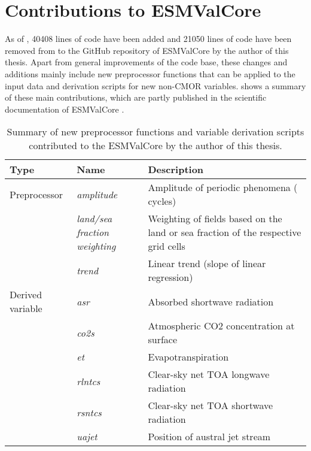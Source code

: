 \section{Contributions to \acs{ESMValCore}}
\label{sec:03:contributions_to_esmvalcore}

As of \TheMonth{}, 40408 lines of code have been added and 21050 lines of code
have been removed from to the GitHub repository of \ac{ESMValCore} by the
author of this thesis. Apart from general improvements of the code base, these
changes and additions mainly include new preprocessor functions that can be
applied to the input data and derivation scripts for new non-\ac{CMOR}
variables.  shows a summary of these main
contributions, which are partly published in the scientific documentation of
\ac{ESMValCore} \autocite{Righi2020}.

\begin{table}[!b]
  \centering
  \begin{tabulary}{\columnwidth}{L L L}
    \toprule
    Type & Name & Description \\
    \midrule
    Preprocessor & \emph{amplitude} & Amplitude of periodic phenomena (\eg{}
    cycles) \\
    \cmidrule(l){2-3}
    & \emph{land/sea fraction weighting} & Weighting of fields based on
    the land or sea fraction of the respective grid cells \\
    \cmidrule(l){2-3}
    & \emph{trend} & Linear trend (slope of linear regression) \\
    \midrule
    Derived variable & \emph{asr} & Absorbed shortwave radiation \\
    \cmidrule(l){2-3}
    & \emph{co2s} & Atmospheric \ac{CO2} concentration at
    surface \\
    \cmidrule(l){2-3}
    & \emph{et} & Evapotranspiration \\
    \cmidrule(l){2-3}
    & \emph{rlntcs} & Clear-sky net \acf{TOA} longwave radiation \\
    \cmidrule(l){2-3}
    & \emph{rsntcs} & Clear-sky net \ac{TOA} shortwave radiation \\
    \cmidrule(l){2-3}
    & \emph{uajet} & Position of austral jet stream \\
    \bottomrule
  \end{tabulary}
  \caption{Summary of new preprocessor functions and variable derivation
    scripts contributed to the \acf{ESMValCore} by the author of this thesis.}
  \label{tab:03:changes_to_esmvalcore}
\end{table}

